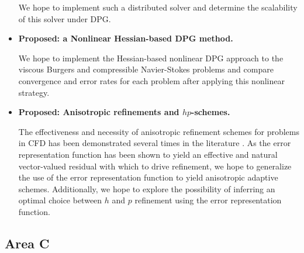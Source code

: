 \begin{itemize}
We hope to implement such a distributed solver and determine the scalability of this solver under DPG.
  
\item{\textbf{Proposed: a Nonlinear Hessian-based DPG method.}}

We hope to implement the Hessian-based nonlinear DPG approach to the viscous Burgers and compressible Navier-Stokes problems and compare convergence and error rates for each problem after applying this nonlinear strategy. 

\item{\textbf{Proposed: Anisotropic refinements and $hp$-schemes.}}

The effectiveness and necessity of anisotropic refinement schemes for problems in CFD has been demonstrated several times in the literature \cite{anisotropy1,anisotropy2}. As the error representation function has been shown to yield an effective and natural vector-valued residual with which to drive refinement, we hope to generalize the use of the error representation function to yield anisotropic adaptive schemes. Additionally, we hope to explore the possibility of inferring an optimal choice between $h$ and $p$ refinement using the error representation function. %

\end{itemize}

\subsection{Area C}

